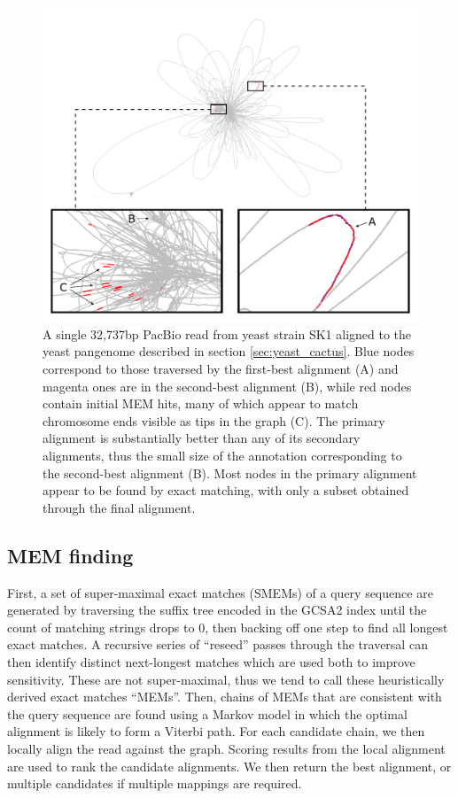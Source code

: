 \begin{figure}[htbp!]
\centering
\includegraphics[width=1.0\textwidth]{Chapter2/Figs/mapping_cactus_pacbio_aln_viz.pdf}
\caption[Alignment of a PacBio read to a yeast pangenome]{
  A single 32,737bp PacBio read from yeast strain SK1 aligned to the yeast pangenome described in section \ref{sec:yeast_cactus}.
  Blue nodes correspond to those traversed by the first-best alignment (A) and magenta ones are in the second-best alignment (B), while red nodes contain initial MEM hits, many of which appear to match chromosome ends visible as tips in the graph (C).
  The primary alignment is substantially better than any of its secondary alignments, thus the small size of the annotation corresponding to the second-best alignment (B).
  Most nodes in the primary alignment appear to be found by exact matching, with only a subset obtained through the final alignment.
}
\label{fig:alignment_to_cactus_yeast}
\end{figure}

\subsection{MEM finding}
First, a set of super-maximal exact matches (SMEMs) of a query sequence are generated by traversing the suffix tree encoded in the GCSA2 index until the count of matching strings drops to 0, then backing off one step to find all longest exact matches. 
A recursive series of ``reseed'' passes through the traversal can then identify distinct next-longest matches which are used both to improve sensitivity.
These are not super-maximal, thus we tend to call these heuristically derived exact matches ``MEMs''.
Then, chains of MEMs that are consistent with the query sequence are found using a Markov model in which the optimal alignment is likely to form a Viterbi path.
For each candidate chain, we then locally align the read against the graph. 
Scoring results from the local alignment are used to rank the candidate alignments.
We then return the best alignment, or multiple candidates if multiple mappings are required.

